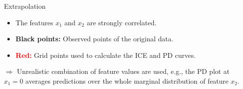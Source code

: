 \documentclass[11pt,compress,t,notes=noshow, aspectratio=169, xcolor=table]{beamer}
\begin{document}
\begin{frame}{Extrapolation}
\begin{itemize}
\item The features $x_1$ and $x_2$ are strongly correlated.
\item \textbf{Black points:} Observed points of the original data.
\item \textbf{\textcolor{red}{Red:}} Grid points used to calculate the ICE and PD curves.
\end{itemize}
$\Rightarrow$ Unrealistic combination of feature values are used, e.g., the PD plot at $x_1=0$ averages predictions over the whole marginal distribution of feature $x_2$.
%
%
%
%
\end{frame}




%
%
\end{document}
